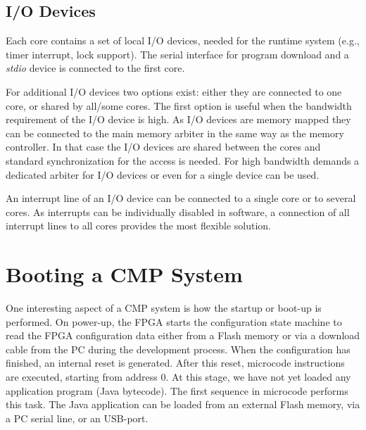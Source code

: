\subsection{I/O Devices}

Each core contains a set of local I/O devices, needed for the runtime
system (e.g., timer interrupt, lock support). The serial interface
for program download and a \emph{stdio} device is connected to the
first core.

For additional I/O devices two options exist: either they are
connected to one core, or shared by all/some cores. The first option
is useful when the bandwidth requirement of the I/O device is high.
As I/O devices are memory mapped they can be connected to the main
memory arbiter in the same way as the memory controller. In that case
the I/O devices are shared between the cores and standard
synchronization for the access is needed. For high bandwidth demands
a dedicated arbiter for I/O devices or even for a single device can
be used.

An interrupt line of an I/O device can be connected to a single core
or to several cores. As interrupts can be individually disabled in
software, a connection of all interrupt lines to all cores provides
the most flexible solution.







\section{Booting a CMP System}


One interesting aspect of a CMP system is how the startup or boot-up
is performed. On power-up, the FPGA starts the configuration state
machine to read the FPGA configuration data either from a Flash
memory or via a download cable from the PC during the development
process. When the configuration has finished, an internal reset is
generated. After this reset, microcode instructions are executed,
starting from address 0. At this stage, we have not yet loaded any
application program (Java bytecode). The first sequence in microcode
performs this task. The Java application can be loaded from an
external Flash memory, via a PC serial line, or an USB-port.

